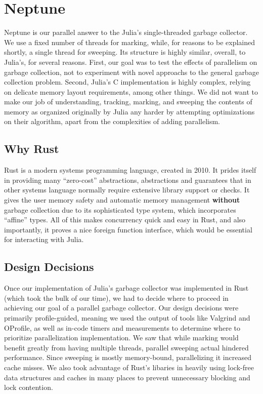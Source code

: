 \section{Neptune} \label{neptune}

Neptune is our parallel answer to the Julia's single-threaded garbage collector.
We use a fixed number of threads for marking, while, for reasons to be explained shortly, a single thread for sweeping.
Its structure is highly similar, overall, to Julia's, for several reasons.
First, our goal was to test the effects of parallelism on garbage collection, not to experiment with novel approachs to the general garbage collection problem.
Second, Julia's C implementation is highly complex, relying on delicate memory layout requirements, among other things.
We did not want to make our job of understanding, tracking, marking, and sweeping the contents of memory as organized originally by Julia any harder by attempting optimizations on their algorithm, apart from the complexities of adding parallelism.

\subsection{Why Rust}
Rust is a modern systems programming language, created in 2010.
It prides itself in providing many ``zero-cost'' abstractions, abstractions and guarantees that in other systems language normally require extensive library support or checks.
It gives the user memory safety and automatic memory management \textbf{without} garbage collection due to its sophisticated type system, which incorporates ``affine'' types.
All of this makes concurrency quick and easy in Rust, and also importantly, it proves a nice foreign function interface, which would be essential for interacting with Julia.

\subsection{Design Decisions}
Once our implementation of Julia's garbage collector was implemented in Rust (which took the bulk of our time), we had to decide where to proceed in achieving our goal of a parallel garbage collector.
Our design decisions were primarily profile-guided, meaning we used the output of tools like Valgrind and OProfile, as well as in-code timers and measurements to determine where to prioritize parallelization implementation.
We saw that while marking would benefit greatly from having multiple threads, parallel sweeping actual hindered performance.
Since sweeping is mostly memory-bound, parallelizing it increased cache misses.
We also took advantage of Rust's libaries in heavily using lock-free data structures and caches in many places to prevent unnecessary blocking and lock contention.
